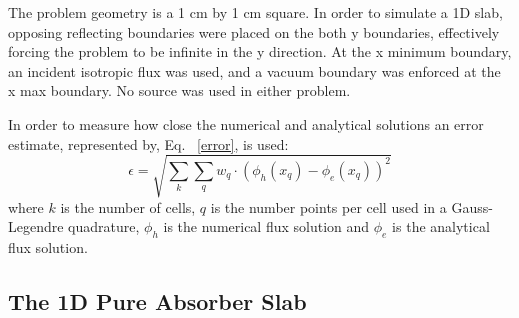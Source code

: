 \documentclass{anstrans}
\newcommand{\norm}[1]{\left\lVert#1\right\rVert}
\begin{document}
The problem geometry is a 1 cm by 1 cm square. In order to simulate a 1D slab, opposing reflecting boundaries were placed on the both y boundaries, effectively forcing the problem to be infinite in the y direction. At the x minimum boundary, an incident isotropic flux was used, and a vacuum boundary was enforced at the x max boundary. No source was used in either problem.

In order to measure how close the numerical and analytical solutions an error estimate, represented by, Eq. ~\eqref{error}, is used:
\begin{equation}
\epsilon = \sqrt{\sum_k \sum_q w_q \cdot(\phi_h(x_q) - \phi_e(x_q))^2}
\label{error}
\end{equation}
where $k$ is the number of cells, $q$ is the number points per cell used in a Gauss-Legendre quadrature, $\phi_h$ is the numerical flux solution and $\phi_e$ is the analytical flux solution.

\subsection{The 1D Pure Absorber Slab}
\end{document}
